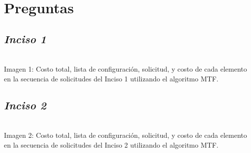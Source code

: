 \section*{Preguntas}

\subsection*{\textit{\textbf{Inciso 1}}}

\begin{center}
\\
\vspace{0.02in}
\small\textcolor{FSBlue}{Imagen 1: Costo total, lista de configuración, solicitud, y costo de cada elemento en la secuencia de solicitudes del Inciso 1 utilizando el algoritmo MTF.}
\end{center}

\subsection*{\textit{\textbf{Inciso 2}}}

\begin{center}
\\
\vspace{0.02in}
\small\textcolor{FSBlue}{Imagen 2: Costo total, lista de configuración, solicitud, y costo de cada elemento en la secuencia de solicitudes del Inciso 2 utilizando el algoritmo MTF.}
\end{center}

